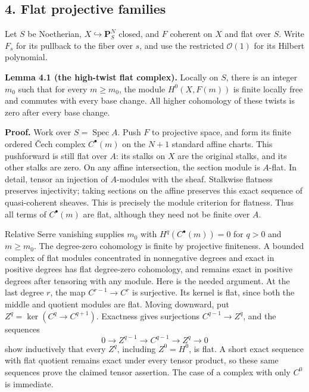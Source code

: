 \documentclass[11pt]{article}
\begin{document}
\subsection{4. Flat projective families}\label{flat-projective-families}

Let \(S\) be Noetherian, \(X\hookrightarrow\mathbf P^N_S\) closed, and
\(F\) coherent on \(X\) and flat over \(S\). Write \(F_s\) for its
pullback to the fiber over \(s\), and use the restricted
\(\mathcal O(1)\) for its Hilbert polynomial.

\textbf{Lemma 4.1 (the high-twist flat complex).} Locally on \(S\),
there is an integer \(m_0\) such that for every \(m\geq m_0\), the
module \(H^0(X,F(m))\) is finite locally free and commutes with every
base change. All higher cohomology of these twists is zero after every
base change.

\textbf{Proof.} Work over \(S=\operatorname{Spec}A\). Push \(F\) to
projective space, and form its finite ordered Čech complex
\(C^\bullet(m)\) on the \(N+1\) standard affine charts. This pushforward
is still flat over \(A\): its stalks on \(X\) are the original stalks,
and its other stalks are zero. On any affine intersection, the section
module is \(A\)-flat. In detail, tensor an injection of \(A\)-modules
with the sheaf. Stalkwise flatness preserves injectivity; taking
sections on the affine preserves this exact sequence of quasi-coherent
sheaves. This is precisely the module criterion for flatness. Thus all
terms of \(C^\bullet(m)\) are flat, although they need not be finite
over \(A\).

Relative Serre vanishing supplies \(m_0\) with \(H^q(C^\bullet(m))=0\)
for \(q>0\) and \(m\geq m_0\). The degree-zero cohomology is finite by
projective finiteness. A bounded complex of flat modules concentrated in
nonnegative degrees and exact in positive degrees has flat degree-zero
cohomology, and remains exact in positive degrees after tensoring with
any module. Here is the needed argument. At the last degree \(r\), the
map \(C^{r-1}\to C^r\) is surjective. Its kernel is flat, since both the
middle and quotient modules are flat. Moving downward, put
\(Z^q=\ker(C^q\to C^{q+1})\). Exactness gives surjections
\(C^{q-1}\to Z^q\), and the sequences \[
0\to Z^{q-1}\to C^{q-1}\to Z^q\to0
\] show inductively that every \(Z^q\), including \(Z^0=H^0\), is flat.
A short exact sequence with flat quotient remains exact under every
tensor product, so these same sequences prove the claimed tensor
assertion. The case of a complex with only \(C^0\) is immediate.
\end{document}
